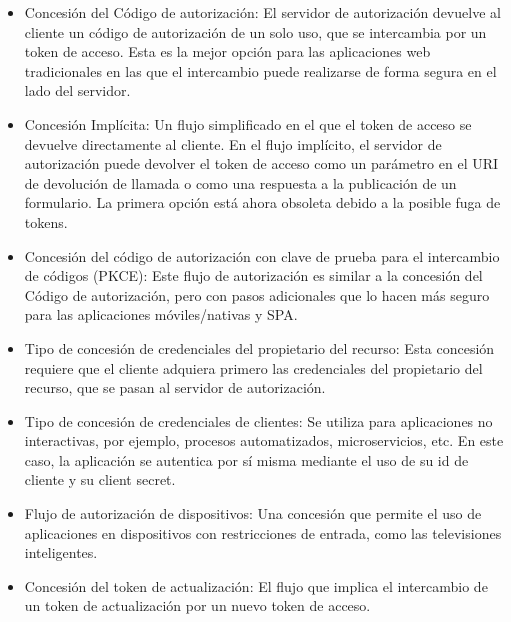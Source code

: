 \documentclass[12pt]{article}
\begin{document}
\begin{itemize}
\item Concesión del Código de autorización: El servidor de autorización devuelve al cliente un código de autorización de un solo uso, que se intercambia por un token de acceso. Esta es la mejor opción para las aplicaciones web tradicionales en las que el intercambio puede realizarse de forma segura en el lado del servidor.
\item Concesión Implícita: Un flujo simplificado en el que el token de acceso se devuelve directamente al cliente. En el flujo implícito, el servidor de autorización puede devolver el token de acceso como un parámetro en el URI de devolución de llamada o como una respuesta a la publicación de un formulario. La primera opción está ahora obsoleta debido a la posible fuga de tokens.
\item Concesión del código de autorización con clave de prueba para el intercambio de códigos (PKCE): Este flujo de autorización es similar a la concesión del Código de autorización, pero con pasos adicionales que lo hacen más seguro para las aplicaciones móviles/nativas y SPA.
\item Tipo de concesión de credenciales del propietario del recurso: Esta concesión requiere que el cliente adquiera primero las credenciales del propietario del recurso, que se pasan al servidor de autorización. 
\item Tipo de concesión de credenciales de clientes: Se utiliza para aplicaciones no interactivas, por ejemplo, procesos automatizados, microservicios, etc. En este caso, la aplicación se autentica por sí misma mediante el uso de su id de cliente y su client secret.
\item Flujo de autorización de dispositivos: Una concesión que permite el uso de aplicaciones en dispositivos con restricciones de entrada, como las televisiones inteligentes.
\item Concesión del token de actualización: El flujo que implica el intercambio de un token de actualización por un nuevo token de acceso.
\end{itemize}
\cite{Auth0}
\end{document}
